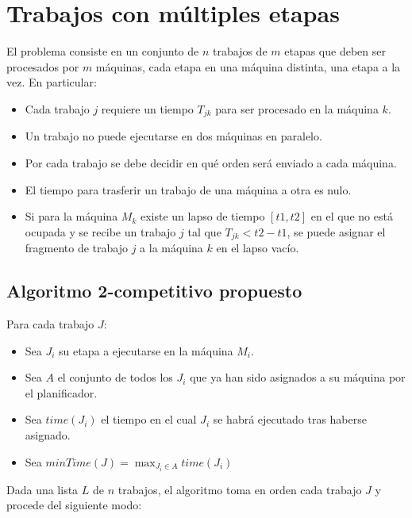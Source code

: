 \documentclass[12pt,letterpaper]{article}
\begin{document}
\section{Trabajos con múltiples etapas}
El problema consiste en un conjunto de $n$ trabajos de $m$ etapas que deben ser procesados por $m$ máquinas, cada etapa en una máquina distinta, una etapa a la vez. En particular:

\begin{itemize}
\item Cada trabajo $j$ requiere un tiempo $T_{jk}$ para ser procesado en la máquina $k$.
\item Un trabajo no puede ejecutarse en dos máquinas en paralelo.
\item Por cada trabajo se debe decidir en qué orden será enviado a cada máquina.
\item El tiempo para trasferir un trabajo de una máquina a otra es nulo.
\item Si para la máquina $M_{k}$ existe un lapso de tiempo $[t1, t2]$ en el que no está ocupada y se recibe un trabajo $j$ tal que $T_{jk} < t2 - t1$, se puede asignar el fragmento de trabajo $j$ a la máquina $k$ en el lapso vacío.
\end{itemize}

\subsection{Algoritmo 2-competitivo propuesto}
\label{sec:prop-alg2}
	Para cada trabajo $J$:
\begin{itemize}
\item Sea $J_{i}$ su etapa a ejecutarse en la máquina $M_{i}$.
\item Sea $A$ el conjunto de todos los $J_{i}$ que ya han sido asignados a su máquina por el planificador.
\item Sea $time(J_{i})$ el tiempo en el cual $J_{i}$ se habrá ejecutado tras haberse asignado.
\item Sea $minTime(J) = \max_{J_{i} \in A}{time(J_{i})}$
\end{itemize}	

Dada una lista $L$ de $n$ trabajos, el algoritmo toma en orden cada trabajo $J$ y procede del siguiente modo:
	
\end{document}
